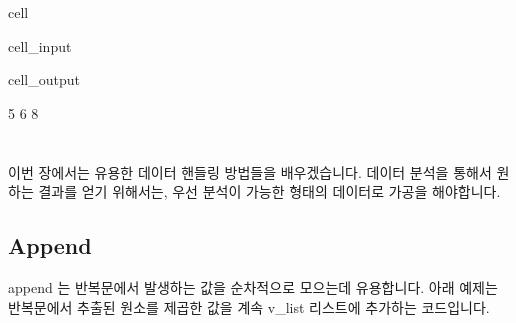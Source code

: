 \documentclass[letterpaper,10pt,english]{jupyterBook}
\begin{document}
\begin{sphinxuseclass}{cell}\begin{sphinxVerbatimInput}

\begin{sphinxuseclass}{cell_input}
\begin{sphinxVerbatim}[commandchars=\\\{\}]
  
        

    
  
\end{sphinxVerbatim}

\end{sphinxuseclass}\end{sphinxVerbatimInput}
\begin{sphinxVerbatimOutput}

\begin{sphinxuseclass}{cell_output}
\begin{sphinxVerbatim}[commandchars=\\\{\}]
5 6 8
\end{sphinxVerbatim}

\end{sphinxuseclass}\end{sphinxVerbatimOutput}

\end{sphinxuseclass}

\chapter{}
\label{\detokenize{chapter2/2.2.0_Useful_Techniques:id1}}\label{\detokenize{chapter2/2.2.0_Useful_Techniques::doc}}
\sphinxAtStartPar
이번 장에서는 유용한 데이터 핸들링 방법들을 배우겠습니다. 데이터 분석을 통해서 원하는 결과를 얻기 위해서는, 우선 분석이 가능한 형태의 데이터로 가공을 해야합니다.


\section{Append}
\label{\detokenize{chapter2/2.2.1_Useful_Techniques:append}}\label{\detokenize{chapter2/2.2.1_Useful_Techniques::doc}}
\sphinxAtStartPar
append 는 반복문에서 발생하는 값을 순차적으로 모으는데 유용합니다. 아래 예제는 반복문에서 추출된 원소를 제곱한 값을 계속 v\_list 리스트에 추가하는 코드입니다.
\end{document}
